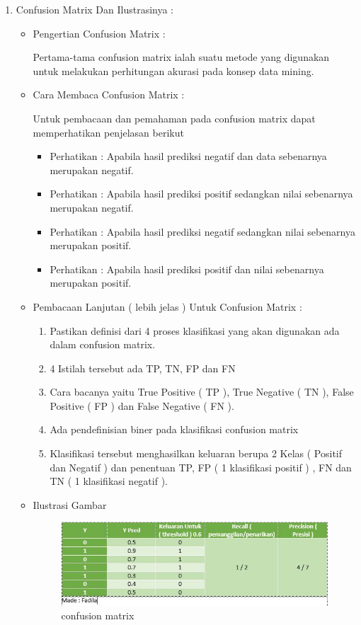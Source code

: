 \begin{enumerate}
\begin{itemize}
\par
\end{itemize}
\item Confusion Matrix Dan Ilustrasinya :
\begin{itemize}
\item Pengertian Confusion Matrix :
\par Pertama-tama confusion matrix ialah suatu metode yang digunakan untuk melakukan perhitungan akurasi pada konsep data mining.
\item Cara Membaca Confusion Matrix :
\par Untuk pembacaan dan pemahaman pada confusion matrix dapat memperhatikan penjelasan berikut
\begin{itemize}
\item Perhatikan : Apabila hasil prediksi negatif dan data sebenarnya merupakan negatif.
\item Perhatikan : Apabila hasil prediksi positif sedangkan nilai sebenarnya merupakan negatif.
\item Perhatikan : Apabila hasil prediksi negatif sedangkan nilai sebenarnya merupakan positif.
\item Perhatikan : Apabila hasil prediksi positif dan nilai sebenarnya merupakan positif.
\end{itemize}
\par
\par
\item Pembacaan Lanjutan ( lebih jelas ) Untuk Confusion Matrix :
\begin{enumerate}
\item Pastikan definisi dari 4 proses klasifikasi yang akan digunakan ada dalam confusion matrix.
\item 4 Istilah tersebut ada TP, TN, FP dan FN
\item Cara bacanya yaitu True Positive ( TP ), True Negative ( TN ), False Positive ( FP ) dan False Negative ( FN ).
\item Ada pendefinisian biner pada klasifikasi confusion matrix
\item Klasifikasi tersebut menghasilkan keluaran berupa 2 Kelas ( Positif dan Negatif ) dan penentuan TP, FP ( 1 klasifikasi positif ) , FN dan TN ( 1 klasifikasi negatif ).
\end{enumerate}
\par

\item Ilustrasi Gambar
\par

\begin{figure}[ht]
\centering
\includegraphics[scale=0.4]{figures/confusion.jpg}
\caption{confusion matrix}
\label{contoh}
\end{figure}


\end{itemize}
\end{enumerate}
